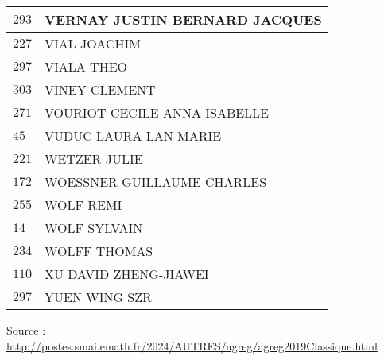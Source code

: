 \begin{xltabular}{\linewidth}{|l|X|}
    \hline
    $293$ & VERNAY JUSTIN BERNARD JACQUES \\
    \hline
    $227$ & VIAL JOACHIM \\
    \hline
    $297$ & VIALA THEO \\
    \hline
    $303$ & VINEY CLEMENT \\
    \hline
    $271$ & VOURIOT CECILE ANNA ISABELLE \\
    \hline
    $45$ & VUDUC LAURA LAN MARIE \\
    \hline
    $221$ & WETZER JULIE \\
    \hline
    $172$ & WOESSNER GUILLAUME CHARLES \\
    \hline
    $255$ & WOLF REMI \\
    \hline
    $14$ & WOLF SYLVAIN \\
    \hline
    $234$ & WOLFF THOMAS \\
    \hline
    $110$ & XU DAVID ZHENG-JIAWEI \\
    \hline
    $297$ & YUEN WING SZR \\
    \hline
  \end{xltabular}

  \begin{flushright}
    {\tiny Source : \url{http://postes.smai.emath.fr/2024/AUTRES/agreg/agreg2019Classique.html}}
  \end{flushright}

